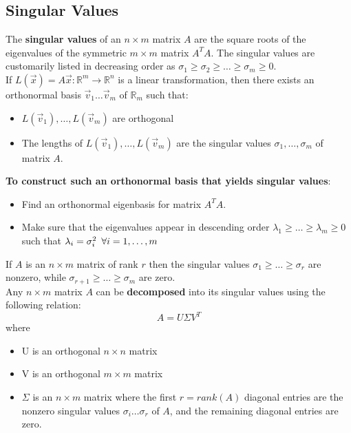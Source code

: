 \documentclass[]{scrartcl}
\begin{document}
	\subsection{Singular Values}
	The \textbf{singular values} of an $n \times m$ matrix $A$ are the square roots of the eigenvalues of the symmetric $m \times m$ matrix $A^TA$. The singular values are customarily listed in decreasing order as $\sigma_1 \geq \sigma_2 \geq \ldots \geq \sigma_m \geq 0$.\\
	
	If $L(\vec{x}) = A\vec{x}: \mathbb{R}^m \rightarrow \mathbb{R}^n$ is a linear transformation, then there exists an orthonormal basis $\vec{v}_1 \ldots \vec{v}_m$ of $\mathbb{R}_m$ such that:
	\begin{itemize}
		\item $L(\vec{v}_1), \ldots ,L(\vec{v}_m)$ are orthogonal
		\item The lengths of $L(\vec{v}_1), \ldots ,L(\vec{v}_m)$ are the singular values $\sigma_1, \ldots , \sigma_m$ of matrix $A$.
	\end{itemize}
	
	\textbf{To construct such an orthonormal basis that yields singular values}:
	\begin{itemize}
		\item Find an orthonormal eigenbasis for matrix $A^TA$.
		\item Make sure that the eigenvalues appear in descending order $\lambda_1 \geq \ldots \geq \lambda_m \geq 0$ such that $\lambda_i = \sigma^2_i \enskip \forall i = 1, \ldots, m$
	\end{itemize}

	If $A$ is an $n \times m$ matrix of rank $r$ then the singular values $\sigma_1 \geq \ldots \geq \sigma_r$ are nonzero, while $\sigma_{r+1} \geq \ldots \geq \sigma_m$ are zero.\\
	
	Any $n \times m$ matrix $A$ can be \textbf{decomposed} into its singular values using the following relation:
	$$
	A = U \Sigma V^T
	$$
	where \begin{itemize}
		\item U is an orthogonal $n \times n$ matrix
		\item V is an orthogonal $m \times m$ matrix
		\item $\Sigma$ is an $n \times m$ matrix where the first $r=rank(A)$ diagonal entries are the nonzero singular values $\sigma_i \ldots \sigma_r$ of $A$, and the remaining diagonal entries are zero.
	\end{itemize}
	
\end{document}

